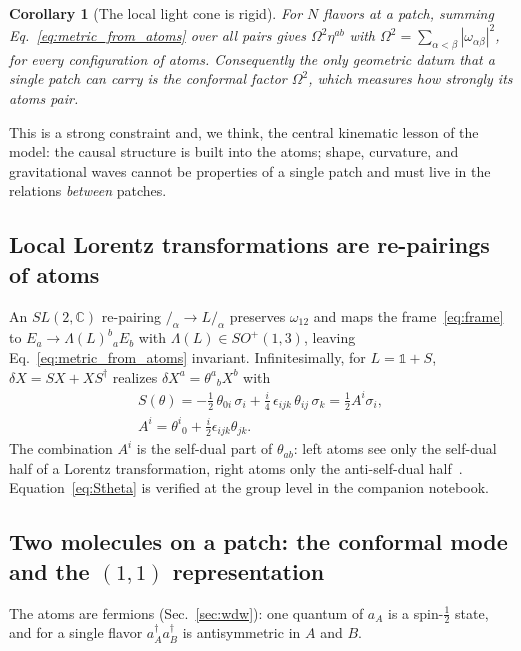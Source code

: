 \documentclass[reprint,aps,prd,amsmath,amssymb,superscriptaddress,nofootinbib,floatfix]{revtex4-2}
\theoremstyle{plain}
\newtheorem{corollary}{Corollary}
\theoremstyle{definition}
\theoremstyle{remark}
\newcommand{\Lat}{\ensuremath{/}}                 %
\newcommand{\Mol}{\ensuremath{X}}                 %
\newcommand{\one}{\mathbb{1}}
\newcommand{\SLC}{SL(2,\mathbb{C})}
\begin{document}
\begin{corollary}[The local light cone is rigid]
\label{cor:rigid}
For $N$ flavors at a patch, summing Eq.~\eqref{eq:metric_from_atoms} over all pairs gives
$\Omega^2\eta^{ab}$ with $\Omega^2=\sum_{\alpha<\beta}|\omega_{\alpha\beta}|^2$, for every configuration of
atoms. Consequently the only geometric datum that a single patch can carry is the conformal factor
$\Omega^2$, which measures how strongly its atoms pair.
\end{corollary}

This is a strong constraint and, we think, the central kinematic lesson of the model: the causal structure
is built into the atoms; shape, curvature, and gravitational waves cannot be properties of a single patch
and must live in the relations \emph{between} patches.

\subsection{Local Lorentz transformations are re-pairings of atoms}

An $\SLC$ re-pairing $\Lat_\alpha\to L\Lat_\alpha$ preserves $\omega_{12}$ and maps the frame~\eqref{eq:frame}
to $E_a\to\Lambda(L)^b{}_aE_b$ with $\Lambda(L)\in SO^+(1,3)$, leaving Eq.~\eqref{eq:metric_from_atoms}
invariant. Infinitesimally, for $L=\one+S$, $\delta\Mol=S\Mol+\Mol S^\dagger$ realizes
$\delta\Mol^a=\theta^a{}_b\Mol^b$ with
\begin{equation}
\begin{gathered}
S(\theta)=-\tfrac12\,\theta_{0i}\,\sigma_i+\tfrac{i}{4}\,\epsilon_{ijk}\,\theta_{ij}\,\sigma_k
=\tfrac12 A^i\sigma_i ,\\
A^i=\theta^i{}_0+\tfrac{i}{2}\epsilon_{ijk}\theta_{jk}.
\end{gathered}
\label{eq:Stheta}
\end{equation}
The combination $A^i$ is the self-dual part of $\theta_{ab}$: left atoms see only the self-dual half of a
Lorentz transformation, right atoms only the anti-self-dual half~\cite{PenroseRindler1984,Plebanski1977}.
Equation~\eqref{eq:Stheta} is verified at the group level in the companion notebook.

\subsection{Two molecules on a patch: the conformal mode and the $(1,1)$ representation}

The atoms are fermions (Sec.~\ref{sec:wdw}): one quantum of $a_A$ is a spin-$\tfrac12$ state, and for a single flavor
$a^\dagger_Aa^\dagger_B$ is antisymmetric in $A$ and $B$.
\end{document}
